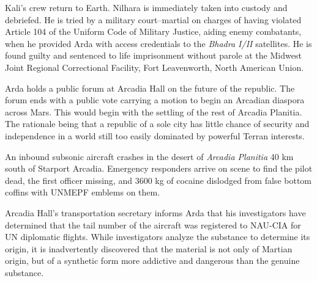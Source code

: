 Kali's crew return to Earth. Nilhara is immediately taken into custody and debriefed. He is tried by a military court--martial on charges of having violated Article 104 of the Uniform Code of Military Justice, aiding enemy combatants, when he provided Arda with access credentials to the {\it Bhadra I/II} satellites. He is found guilty and sentenced to life imprisonment without parole at the Midwest Joint Regional Correctional Facility, Fort Leavenworth, North American Union.
\StopTimelineDate

Arda holds a public forum at Arcadia Hall on the future of the republic. The forum ends with a public vote carrying a motion to begin an Arcadian diaspora across Mars. This would begin with the settling of the rest of Arcadia Planitia. The rationale being that a republic of a sole city has little chance of security and independence in a world still too easily dominated by powerful Terran interests.
\StopTimelineDate

An inbound subsonic aircraft crashes in the desert of {\it Arcadia Planitia} 40 km south of Starport Arcadia. Emergency responders arrive on scene to find the pilot dead, the first officer missing, and 3600 kg of cocaine dislodged from false bottom coffins with UNMEPF emblems on them. 

Arcadia Hall's transportation secretary informs Arda that his investigators have determined that the tail number of the aircraft was registered to NAU-CIA for UN diplomatic flights. While investigators analyze the substance to determine its origin, it is inadvertently discovered that the material is not only of Martian origin, but of a synthetic form more addictive and dangerous than the genuine substance.
\StopTimelineDate

